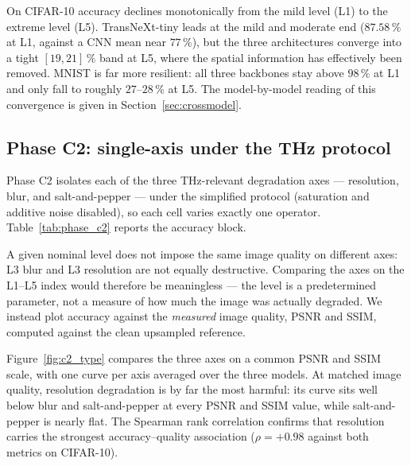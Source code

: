 On CIFAR-10 accuracy declines monotonically from the mild level (L1) to the
extreme level (L5). TransNeXt-tiny leads at the mild and moderate end
($87.58\,\%$ at L1, against a CNN mean near $77\,\%$), but the three
architectures converge into a tight $[19,21]\,\%$ band at L5, where the spatial
information has effectively been removed. MNIST is far more resilient: all
three backbones stay above $98\,\%$ at L1 and only fall to roughly
$27$--$28\,\%$ at L5. The model-by-model reading of this convergence is given
in Section~\ref{sec:crossmodel}.

\subsection{Phase C2: single-axis under the THz protocol}
\label{sec:tests:phase_c2}
Phase C2 isolates each of the three THz-relevant degradation axes ---
resolution, blur, and salt-and-pepper --- under the simplified protocol
(saturation and additive noise disabled), so each cell varies exactly one
operator. Table~\ref{tab:phase_c2} reports the accuracy block.



A given nominal level does not impose the same image quality on different
axes: L3 blur and L3 resolution are not equally destructive. Comparing the
axes on the L1--L5 index would therefore be meaningless --- the level is a
predetermined parameter, not a measure of how much the image was actually
degraded. We instead plot accuracy against the \emph{measured} image quality,
PSNR and SSIM, computed against the clean upsampled reference.

Figure~\ref{fig:c2_type} compares the three axes on a common PSNR and SSIM
scale, with one curve per axis averaged over the three models. At matched image
quality, resolution degradation is by far the most harmful: its curve sits well
below blur and salt-and-pepper at every PSNR and SSIM value, while
salt-and-pepper is nearly flat. The Spearman rank correlation confirms that
resolution carries the strongest accuracy--quality association
($\rho = +0.98$ against both metrics on CIFAR-10).

